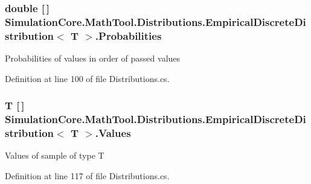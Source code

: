 \subsubsection[{\texorpdfstring{Probabilities}{Probabilities}}]{\setlength{\rightskip}{0pt plus 5cm}double \mbox{[}$\,$\mbox{]} {\bf Simulation\+Core.\+Math\+Tool.\+Distributions.\+Empirical\+Discrete\+Distribution}$<$ T $>$.Probabilities\hspace{0.3cm}{\ttfamily [get]}}\hypertarget{class_simulation_core_1_1_math_tool_1_1_distributions_1_1_empirical_discrete_distribution_a1cf1fc016a8476e86f157cb6bb40e66c}{}\label{class_simulation_core_1_1_math_tool_1_1_distributions_1_1_empirical_discrete_distribution_a1cf1fc016a8476e86f157cb6bb40e66c}


Probabilities of values in order of passed values 



Definition at line 100 of file Distributions.\+cs.

\subsubsection[{\texorpdfstring{Values}{Values}}]{\setlength{\rightskip}{0pt plus 5cm}T \mbox{[}$\,$\mbox{]} {\bf Simulation\+Core.\+Math\+Tool.\+Distributions.\+Empirical\+Discrete\+Distribution}$<$ T $>$.Values\hspace{0.3cm}{\ttfamily [get]}}\hypertarget{class_simulation_core_1_1_math_tool_1_1_distributions_1_1_empirical_discrete_distribution_a1d9a895a22c7ad371fb99cfbdd56fcce}{}\label{class_simulation_core_1_1_math_tool_1_1_distributions_1_1_empirical_discrete_distribution_a1d9a895a22c7ad371fb99cfbdd56fcce}


Values of sample of type T 



Definition at line 117 of file Distributions.\+cs.

